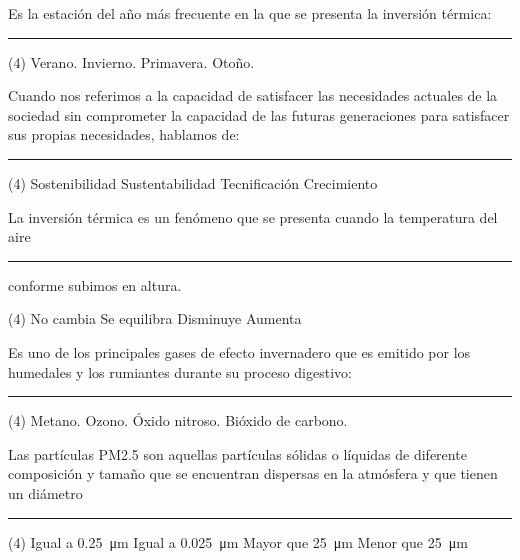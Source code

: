 \documentclass[12pt, letter]{exam}
\begin{document}
\begin{questions}
    \question Es la estación del año más frecuente en la que se presenta la inversión térmica: \rule{2cm}{0.1mm}
    \begin{tasks}(4)
        \task Verano.
        \task Invierno.
        \task Primavera.
        \task Otoño.
    \end{tasks}
    \question Cuando nos referimos a la capacidad de satisfacer las necesidades actuales de la sociedad sin comprometer la capacidad de las futuras generaciones para satisfacer sus propias necesidades, hablamos de: \rule{2cm}{0.1mm}
    \begin{tasks}(4)
        \task Sostenibilidad
        \task Sustentabilidad
        \task Tecnificación
        \task Crecimiento
    \end{tasks}
    \question La inversión térmica es un fenómeno que se presenta cuando la temperatura del aire \rule{2cm}{0.1mm} conforme subimos en altura.
    \begin{tasks}(4)
        \task No cambia
        \task Se equilibra
        \task Disminuye
        \task Aumenta
    \end{tasks}
    \question Es uno de los principales gases de efecto invernadero que es emitido por los humedales y los rumiantes durante su proceso digestivo: \rule{2cm}{0.1mm}
    \begin{tasks}(4)
        \task Metano.
        \task Ozono.
        \task Óxido nitroso.
        \task Bióxido de carbono.
    \end{tasks}
    \question Las partículas PM2.5 son aquellas partículas sólidas o líquidas de diferente composición y tamaño que se encuentran dispersas en la atmósfera y que tienen un diámetro \rule{2cm}{0.1mm}
    \begin{tasks}(4)
        \task Igual a \SI{0.25}{\micro\meter}
        \task Igual a \SI{0.025}{\micro\meter}
        \task Mayor que \SI{25}{\micro\meter}
        \task Menor que \SI{25}{\micro\meter}
    \end{tasks}
    
\end{questions}

\newpage
\end{document}
